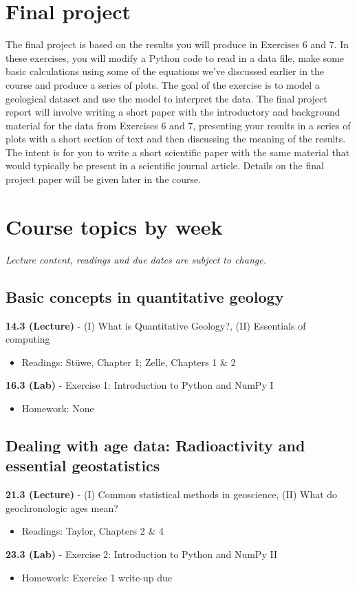 \documentclass[11pt,a4paper]{article}
\begin{document}
\section*{Final project}
The final project is based on the results you will produce in Exercises 6 and 7.
In these exercises, you will modify a Python code to read in a data file, make some basic calculations using some of the equations we've discussed earlier in the course and produce a series of plots.
The goal of the exercise is to model a geological dataset and use the model to interpret the data.
The final project report will involve writing a short paper with the introductory and background material for the data from Exercises 6 and 7, presenting your results in a series of plots with a short section of text and then discussing the meaning of the results.
The intent is for you to write a short scientific paper with the same material that would typically be present in a scientific journal article.
Details on the final project paper will be given later in the course.

\newpage

\section*{Course topics by week}
\textit{Lecture content, readings and due dates are subject to change.}

\subsection*{Basic concepts in quantitative geology}
\textbf{14.3 (Lecture)} - (I) What is Quantitative Geology?, (II) Essentials of computing
\begin{itemize}
  \item Readings: St\"{u}we, Chapter 1; Zelle, Chapters 1 \& 2
\end{itemize}
\textbf{16.3 (Lab)} - Exercise 1: Introduction to Python and NumPy I
\begin{itemize}
  \item Homework: None
\end{itemize}

\subsection*{Dealing with age data: Radioactivity and essential geostatistics}
\textbf{21.3 (Lecture)} - (I) Common statistical methods in geoscience, (II) What do geochronologic ages mean?
\begin{itemize}
  \item Readings: Taylor, Chapters 2 \& 4
\end{itemize}
\textbf{23.3 (Lab)} - Exercise 2: Introduction to Python and NumPy II
\begin{itemize}
  \item Homework: Exercise 1 write-up due
\end{itemize}
\end{document}
